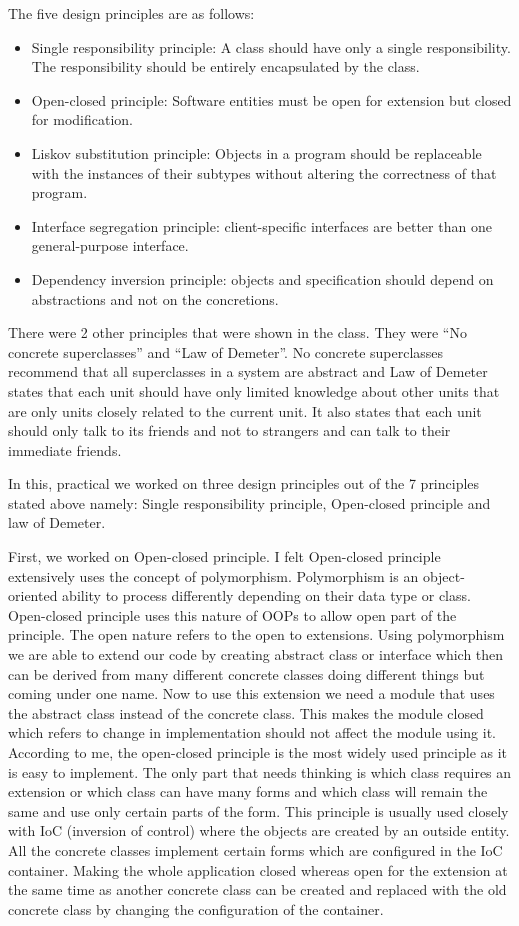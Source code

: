 \documentclass[12pt]{article}
\begin{document}
The five design principles are as follows:

\begin{itemize}
    \item Single responsibility principle: A class should have only a single responsibility. The responsibility should be entirely encapsulated by the class.
    \item Open-closed principle: Software entities must be open for extension but closed for modification.
    \item Liskov substitution principle: Objects in a program should be replaceable with the instances of their subtypes without altering the correctness of that program.
    \item Interface segregation principle: client-specific interfaces are better than one general-purpose interface.
    \item Dependency inversion principle: objects and specification should depend on abstractions and not on the concretions.
\end{itemize}

There were 2 other principles that were shown in the class. They were ``No concrete superclasses'' and ``Law of Demeter''. No concrete superclasses recommend that all superclasses in a system are abstract and Law of Demeter states that each unit should have only limited knowledge about other units that are only units closely related to the current unit. It also states that each unit should only talk to its friends and not to strangers and can talk to their immediate friends.

In this, practical we worked on three design principles out of the 7 principles stated above namely: Single responsibility principle, Open-closed principle and law of Demeter.

First, we worked on Open-closed principle. I felt Open-closed principle extensively uses the concept of polymorphism. Polymorphism is an object-oriented ability to process differently depending on their data type or class. Open-closed principle uses this nature of OOPs to allow open part of the principle. The open nature refers to the open to extensions. Using polymorphism we are able to extend our code by creating abstract class or interface which then can be derived from many different concrete classes doing different things but coming under one name. Now to use this extension we need a module that uses the abstract class instead of the concrete class. This makes the module closed which refers to change in implementation should not affect the module using it. According to me, the open-closed principle is the most widely used principle as it is easy to implement. The only part that needs thinking is which class requires an extension or which class can have many forms and which class will remain the same and use only certain parts of the form. This principle is usually used closely with IoC (inversion of control) where the objects are created by an outside entity. All the concrete classes implement certain forms which are configured in the IoC container. Making the whole application closed whereas open for the extension at the same time as another concrete class can be created and replaced with the old concrete class by changing the configuration of the container.
\end{document}

